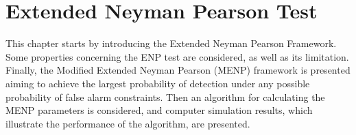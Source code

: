 \chapter{Extended Neyman Pearson Test}

\newcommand{\bom}{\boldsymbol{\omega}}
This chapter starts by introducing the Extended Neyman Pearson Framework. Some properties concerning the ENP test are considered, as well as its limitation. Finally, the Modified Extended Neyman Pearson (MENP) framework is presented aiming to achieve the largest probability of detection under any possible probability of false alarm constraints. Then an algorithm for calculating the MENP parameters is considered, and  computer simulation results, which illustrate the performance of the algorithm, are presented. 

\typeout{}


\typeout{}


\typeout{}


\typeout{}


\typeout{}

                     
